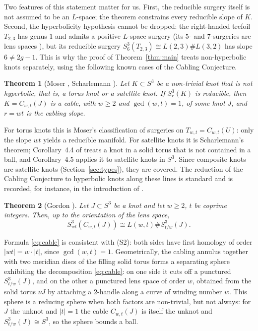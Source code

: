 \documentclass[12pt]{article}
\newcommand{\Surg}[2]{S^3_{#1}(#2)}
\newcommand{\nbd}{\nu}
\newtheorem{theorem}{Theorem}[section]
\theoremstyle{definition}
\theoremstyle{remark}
\begin{document}
Two features of this statement matter for us. First, the reducible
surgery itself is not assumed to be an \(L\)-space; the theorem
constrains every reducible slope of \(K\). Second, the hyperbolicity
hypothesis cannot be dropped: the right-handed trefoil \(T_{2,3}\) has
genus \(1\) and admits a positive \(L\)-space surgery (its \(5\)- and
\(7\)-surgeries are lens spaces \cite{Moser1971}), but its reducible
surgery \(\Surg{6}{T_{2,3}}\cong L(2,3)\#L(3,2)\) has slope
\(6\neq 2g-1\).
This is why the proof of Theorem~\ref{thm:main} treats non-hyperbolic
knots separately, using the following known cases of the Cabling
Conjecture.

\begin{theorem}[Moser {\cite{Moser1971}}, Scharlemann {\cite[Corollaries~4.4--4.5]{Scharlemann1990}}]\label{thm:cabling}
Let \(K\subset S^3\) be a non-trivial knot that is not hyperbolic, that
is, a torus knot or a satellite knot. If \(\Surg{r}{K}\) is reducible,
then \(K=C_{w,t}(J)\) is a cable, with \(w\geq2\) and \(\gcd(w,t)=1\), of
some knot \(J\), and \(r=wt\) is the cabling slope.
\end{theorem}

For torus knots this is Moser's classification of surgeries on
\(T_{w,t}=C_{w,t}(U)\): only the slope \(wt\) yields a reducible
manifold. For satellite knots it is Scharlemann's theorem; Corollary~4.4
of \cite{Scharlemann1990} treats a knot in a solid torus that is not
contained in a ball, and Corollary~4.5 applies it to satellite knots in
\(S^3\). Since composite knots are satellite knots
(Section~\ref{sec:types}), they are covered. The reduction of the
Cabling Conjecture to hyperbolic knots along these lines is standard and
is recorded, for instance, in the introduction of \cite{HLZ2015}.

\begin{theorem}[Gordon {\cite[Corollary~7.3]{Gordon1983}}]\label{thm:gordon}
Let \(J\subset S^3\) be a knot and let \(w\geq2\), \(t\) be coprime
integers. Then, up to the orientation of the lens space,
\begin{equation}\label{eq:cable}
 \Surg{wt}{C_{w,t}(J)}\cong L(w,t)\#\Surg{t/w}{J}.
\end{equation}
\end{theorem}

Formula \eqref{eq:cable} is consistent with (S2): both sides have first
homology of order \(|wt|=w\cdot|t|\), since \(\gcd(w,t)=1\). Geometrically,
the cabling annulus together with two meridian discs of the filling
solid torus forms a separating sphere exhibiting the decomposition
\eqref{eq:cable}: on one side it cuts off a punctured \(\Surg{t/w}{J}\),
and on the other a punctured lens space of order \(w\), obtained from
the solid torus \(\nbd J\) by attaching a \(2\)-handle along a curve of
winding number \(w\). This sphere is a reducing sphere when both factors
are non-trivial, but not always: for \(J\) the unknot and \(|t|=1\) the
cable \(C_{w,t}(J)\) is itself the unknot and \(\Surg{t/w}{J}\cong S^3\),
so the sphere bounds a ball.
\end{document}
